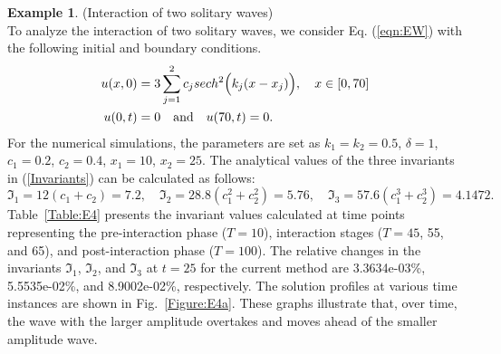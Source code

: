 \documentclass[11pt,a4paper]{amsart}
\theoremstyle{plain}
\theoremstyle{definition}
\newtheorem{example}[theorem]{Example}
\theoremstyle{remark}
\numberwithin{equation}{section}
\begin{document}
\begin{example}\label{example:4}
\normalfont
(Interaction of two solitary waves) \\
To analyze the interaction of two solitary waves, we consider Eq. (\ref{eqn:EW}) with the following initial and boundary conditions.
\begin{equation}\label{IC1:4}
\begin{split}
     u(x,0) &=3 \sum_{j=1}^2 c_j sech^2\Bigl(k_j(x-x_j)\Bigr), \quad x \in [0,70]\\
     u(0,t) &= 0 \quad \text{and} \quad u(70,t) = 0.
\end{split}
\end{equation}
For the numerical simulations, the parameters are set as  $k_1=k_2=0.5$, $\delta = 1$, $c_1=0.2$, $c_2=0.4$, $x_1 = 10$, $x_2 = 25$. The analytical values \cite{raslan2004computational} of the three invariants in (\ref{Invariants}) can be calculated as follows:
\begin{equation}
    \mathfrak{I}_1 = 12(c_1 + c_2) = 7.2 , \quad \mathfrak{I}_2 = 28.8(c_1^2 + c_2^2) = 5.76, \quad \mathfrak{I}_3 = 57.6(c_1^3 + c_2^3) = 4.1472.
\end{equation}
Table~\ref{Table:E4} presents the invariant values calculated at time points representing the pre-interaction phase ($T = 10$), interaction stages ($T = 45$, 55, and 65), and post-interaction phase ($T = 100$). The relative changes in the invariants  $\mathfrak{I}_1$, $\mathfrak{I}_2$, and $\mathfrak{I}_3$  at $t=25$ for the current method are 3.3634e-03\%, 5.5535e-02\%, and 8.9002e-02\%, respectively. The solution profiles at various time instances are shown in Fig.~\ref{Figure:E4a}. These graphs illustrate that, over time, the wave with the larger amplitude overtakes and moves ahead of the smaller amplitude wave.


\end{example}
\end{document}
